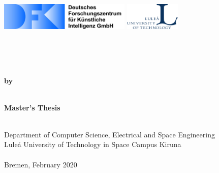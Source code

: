 
\begin{titlingpage}%
    \begin{flushleft}
        \includegraphics[height=13mm]{pictures/logo_dfki_text}\hfill %
        \includegraphics[height=13mm]{pictures/logo_uni}~\\%
    \end{flushleft}
    \vspace{3mm}
    \vspace{8mm}
    \textbf{\Large{}}\\

    \begin{center}
        \textbf{\Large{\myWorkingTitle}}\\
        \textbf{\Large{}}\\[2ex]
        \textbf{by}\\
        \textbf{\thesisAuthor}\\
        \vspace{3cm}

        \textbf{{Master's Thesis}}\\
        \textbf{}\\

        \vspace{4cm}

        Department of Computer Science, Electrical and Space Engineering\\
        Luleå University of Technology in Space Campus Kiruna\\
        \textbf{}\\
        \vspace{1.6cm}
        {Bremen, February 2020}


    \end{center}

\end{titlingpage}%
